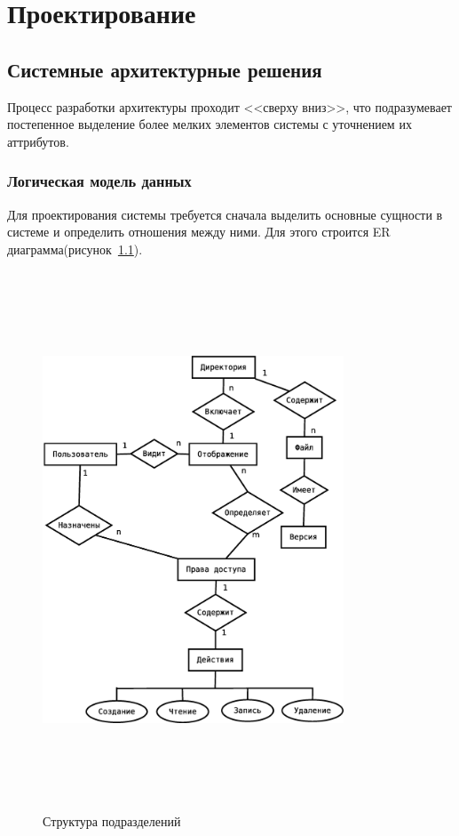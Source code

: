 \documentclass[utf8,usehyperref,12pt]{G7-32}
\begin{document}


\chapter{Проектирование}
\section{Системные архитектурные решения}
Процесс разработки архитектуры проходит <<сверху вниз>>, что подразумевает постепенное выделение более мелких элементов системы с уточнением их аттрибутов.

\subsection{Логическая модель данных}

Для проектирования системы требуется сначала выделить основные сущности в системе и определить отношения между ними. Для этого строится ER диаграмма(рисунок~\ref{fig:er_diagramm}).

\begin{figure}[ht]
   \centering%
   \includegraphics[height=160mm, width=0.8\textwidth, clip, keepaspectratio]{pictures/ER}
   \caption{Структура подразделений}\label{fig:er_diagramm}
 \end{figure}
 
\end{document}
